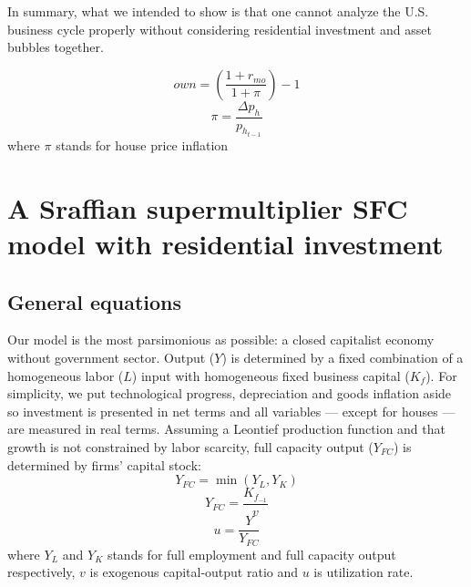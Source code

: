 \documentclass[11pt]{article}
\begin{document}
In summary, what we intended to show is that one cannot analyze the U.S. business cycle properly without considering residential investment and asset bubbles together.





\begin{equation}
\label{_own}
own = \left(\frac{1+r_{mo}}{1+\pi}\right) -1
\end{equation}
$$
\pi = \frac{\Delta p_h}{p_{h_{t-1}}}
$$
where \(\pi\) stands for house price inflation


\section{A Sraffian supermultiplier SFC model with residential investment}
\label{sec:org434517f}
\label{sec:Model}
\subsection{General equations}
\label{sec:orgb4ebb9e}

Our model is the most parsimonious as possible: a closed capitalist economy without government sector. Output (\(Y\)) is determined by  a fixed combination of a homogeneous labor (\(L\)) input with homogeneous fixed business capital (\(K_f\)). 
For simplicity, we put technological progress, depreciation and goods inflation aside so investment is presented in net terms and all variables --- except for houses --- are measured in real terms.
Assuming a Leontief production function and that growth is not constrained by labor scarcity, full capacity output (\(Y_{FC}\)) is
determined by firms' capital stock:
\begin{equation}
\label{_Leontieff}
    Y_{FC} = \min (Y_L, Y_K)
\end{equation}
\begin{equation}
\label{_YFC}
    Y_{FC} = \frac{K_{f_{-1}}}{v}
\end{equation}
\begin{equation}
\label{_u}
    u = \frac{Y}{Y_{FC}}
\end{equation}
where \(Y_L\) and \(Y_K\) stands for full employment and full capacity output respectively, \(v\) is exogenous capital-output ratio and \(u\) is utilization rate.
\end{document}
